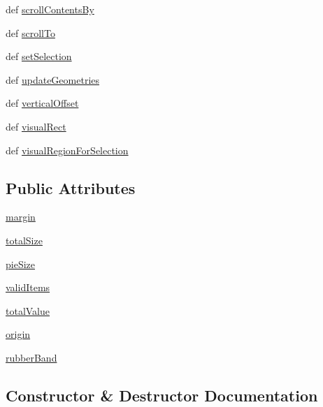 \begin{DoxyCompactItemize}
def \hyperlink{classchart_1_1PieView_a3ffb17ce3621da467c20f189a9568e83}{scroll\+Contents\+By}
\item 
def \hyperlink{classchart_1_1PieView_abf2f06250075f078b942ec6978e89bdf}{scroll\+To}
\item 
def \hyperlink{classchart_1_1PieView_ad79285cbf69aae60e118cfb2e95ec198}{set\+Selection}
\item 
def \hyperlink{classchart_1_1PieView_a1f4fb2e0df6ed6b9c17c2296ea772393}{update\+Geometries}
\item 
def \hyperlink{classchart_1_1PieView_a23fc8ee525a9f1983f8af72b7359f654}{vertical\+Offset}
\item 
def \hyperlink{classchart_1_1PieView_a525bafaf4086f0a89ce544e466e4c320}{visual\+Rect}
\item 
def \hyperlink{classchart_1_1PieView_a69f5f38f0b92329c95b00b3e4a57cabc}{visual\+Region\+For\+Selection}
\end{DoxyCompactItemize}
\subsection*{Public Attributes}
\begin{DoxyCompactItemize}
\item 
\hyperlink{classchart_1_1PieView_a0fb477a76680d5eb82cb318e3fa3d58a}{margin}
\item 
\hyperlink{classchart_1_1PieView_a765830427e3d9f955c36230155c4eda5}{total\+Size}
\item 
\hyperlink{classchart_1_1PieView_a864ba262f5be42df001c0bc65b4b6ce2}{pie\+Size}
\item 
\hyperlink{classchart_1_1PieView_a029961f11f9deb755fb75fef1d6d3179}{valid\+Items}
\item 
\hyperlink{classchart_1_1PieView_acc21a9392e901e12b3ac9a517427f620}{total\+Value}
\item 
\hyperlink{classchart_1_1PieView_a638493e42376a2160ceab9b7b38c65bd}{origin}
\item 
\hyperlink{classchart_1_1PieView_a4b2ac7ee894044fc7cc05506843fbb47}{rubber\+Band}
\end{DoxyCompactItemize}


\subsection{Constructor \& Destructor Documentation}
\hypertarget{classchart_1_1PieView_a709a8b62a773d5370920bbd6add1e669}{}

